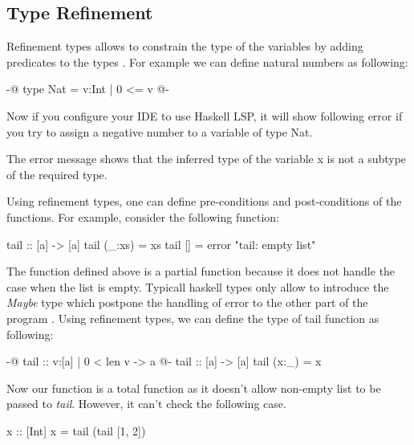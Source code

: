 \documentclass[]{rptuseminar}
\begin{document}
\subsection{Type Refinement}
Refinement types allows to constrain the type of the variables by adding predicates to the types \cite{jhala_programming_2020}. For example we can define natural numbers as following:

\begin{haskell}
 {-@ type Nat = {v:Int | 0 <= v} @-}
\end{haskell}

Now if you configure your IDE to use Haskell LSP, it will show following error if you try to assign a negative number to a variable of type Nat.
The error message shows that the inferred type of the variable x is not a subtype of the required type.

Using refinement types, one can define pre-conditions and post-conditions of the functions\cite{jhala_programming_2020}. 
For example, consider the following function:

\begin{haskell}
 tail :: [a] -> [a]
 tail (_:xs) = xs
 tail [] = error "tail: empty list"
\end{haskell}

The function defined above is a partial function because it does not handle the case when the list is empty. 
Typicall haskell types only allow to introduce the \textit{Maybe} type which postpone the handling of error to the other 
part of the program \cite{jhala_programming_2020}. Using refinement types, we can define the type of tail function as following:

\begin{haskell}
 {-@ tail :: {v:[a] | 0 < len v} -> a @-}
 tail :: [a] -> [a]
 tail (x:_) = x
\end{haskell}

Now our function is a total function as it doesn't allow non-empty list to be passed to \textit{tail}. However, it can't 
check the following case.

\begin{haskell}
 x :: [Int]
 x = tail (tail [1, 2])
\end{haskell}
\end{document}
